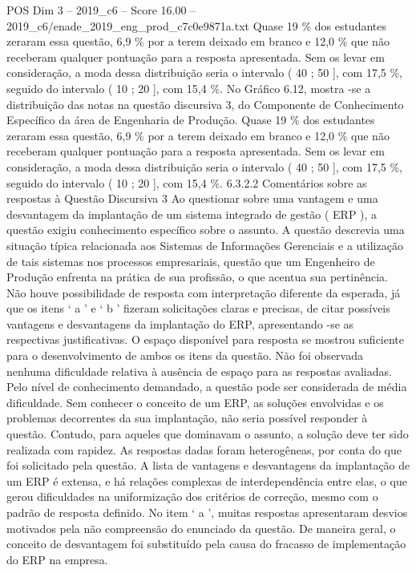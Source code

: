 \begin{textsample}{POS Dim 3 – 2019\_c6 – Score 16.00 – 2019\_c6/enade\_2019\_eng\_prod\_c7c0e9871a.txt}
Quase 19 \% dos estudantes zeraram essa questão, 6,9 \% por a terem deixado em branco e 12,0 \% que não receberam qualquer pontuação para a resposta apresentada.
Sem os levar em consideração, a moda dessa distribuição seria o intervalo ( 40 ; 50 ], com 17,5 \%, seguido do intervalo ( 10 ; 20 ], com 15,4 \%.
No Gráfico 6.12, mostra -se a distribuição das notas na questão discursiva 3, do Componente de Conhecimento Específico da área de Engenharia de Produção.
Quase 19 \% dos estudantes zeraram essa questão, 6,9 \% por a terem deixado em branco e 12,0 \% que não receberam qualquer pontuação para a resposta apresentada.
Sem os levar em consideração, a moda dessa distribuição seria o intervalo ( 40 ; 50 ], com 17,5 \%, seguido do intervalo ( 10 ; 20 ], com 15,4 \%. 6.3.2.2 Comentários sobre as respostas à Questão Discursiva 3 Ao questionar sobre uma vantagem e uma desvantagem da implantação de um sistema integrado de gestão ( ERP ), a questão exigiu conhecimento específico sobre o assunto.
A questão descrevia uma situação típica relacionada aos Sistemas de Informações Gerenciais e a utilização de tais sistemas nos processos empresariais, questão que um Engenheiro de Produção enfrenta na prática de sua profissão, o que acentua sua pertinência.
Não houve possibilidade de resposta com interpretação diferente da esperada, já que os itens ‘ a ’ e ‘ b ’ fizeram solicitações claras e precisas, de citar possíveis vantagens e desvantagens da implantação do ERP, apresentando -se as respectivas justificativas.
O espaço disponível para resposta se mostrou suficiente para o desenvolvimento de ambos os itens da questão.
Não foi observada nenhuma dificuldade relativa à ausência de espaço para as respostas avaliadas.
Pelo nível de conhecimento demandado, a questão pode ser considerada de média dificuldade.
Sem conhecer o conceito de um ERP, as soluções envolvidas e os problemas decorrentes da sua implantação, não seria possível responder à questão.
Contudo, para aqueles que dominavam o assunto, a solução deve ter sido realizada com rapidez.
As respostas dadas foram heterogêneas, por conta do que foi solicitado pela questão.
A lista de vantagens e desvantagens da implantação de um ERP é extensa, e há relações complexas de interdependência entre elas, o que gerou dificuldades na uniformização dos critérios de correção, mesmo com o padrão de resposta definido.
No item ‘ a ’, muitas respostas apresentaram desvios motivados pela não compreensão do enunciado da questão.
De maneira geral, o conceito de desvantagem foi substituído pela causa do fracasso de implementação do ERP na empresa.

\end{textsample}
